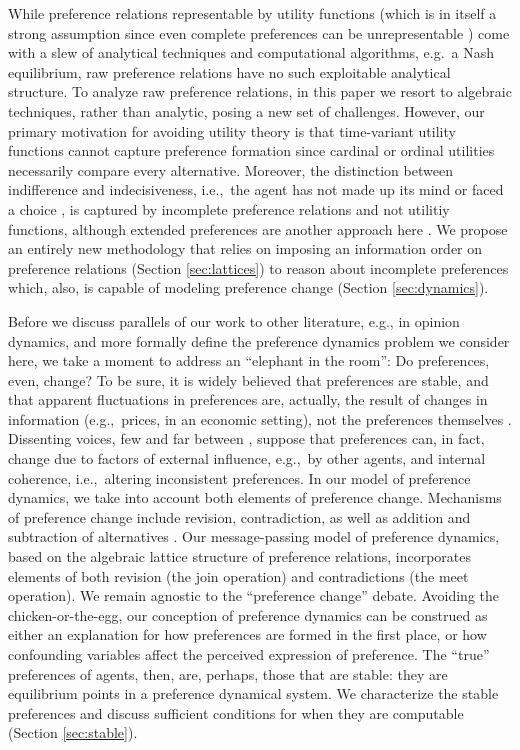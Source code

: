 \documentclass[conference]{ieeeconf}
\begin{document}
While preference relations representable by utility functions (which is in itself a strong assumption since even complete preferences can be unrepresentable \cite{Beardon2002}) come with a slew of analytical techniques and computational algorithms, e.g.~a Nash equilibrium, raw preference relations have no such exploitable analytical structure. To analyze raw preference relations, in this paper we resort to algebraic techniques, rather than analytic, posing a new set of challenges. However, our primary motivation for avoiding utility theory is that time-variant utility functions cannot capture preference formation since cardinal or ordinal utilities necessarily compare every alternative. Moreover, the distinction between indifference and indecisiveness, i.e.,~the agent has not made up its mind or faced a choice \cite{eliaz2006}, is captured by incomplete preference relations and not utilitiy functions, although extended preferences are another approach here \cite{harsanyi1955}. We propose an entirely new methodology that relies on imposing an information order on preference relations (Section \ref{sec:lattices}) to reason about incomplete preferences which, also, is capable of modeling preference change (Section \ref{sec:dynamics}). 

Before we discuss parallels of our work to other literature, e.g., in opinion dynamics, and more formally define the preference dynamics problem we consider here, we take a moment to address an ``elephant in the room'': Do preferences, even, change? To be sure, it is widely believed that preferences are stable, and that apparent fluctuations in preferences are, actually, the result of changes in information (e.g.,~prices, in an economic setting), not the preferences themselves \cite{stigler1977}. Dissenting voices, few and far between \cite{hansen1995}, suppose that preferences can, in fact, change due to factors of external influence, e.g.,~by other agents, and internal coherence, i.e.,~altering inconsistent preferences. In our model of preference dynamics, we take into account both elements of preference change. Mechanisms of preference change include revision, contradiction, as well as addition and subtraction of alternatives \cite{hansen1995}. Our message-passing model of preference dynamics, based on the algebraic lattice structure of preference relations, incorporates elements of both revision (the join operation) and contradictions (the meet operation). We remain agnostic to the ``preference change'' debate. Avoiding the chicken-or-the-egg, our conception of preference dynamics can be construed as either an explanation for how preferences are formed in the first place, or how confounding variables affect the perceived expression of preference. The ``true'' preferences of agents, then, are, perhaps, those that are stable: they are equilibrium points in a preference dynamical system. We characterize the stable preferences and discuss sufficient conditions for when they are computable (Section \ref{sec:stable}).
\end{document}

